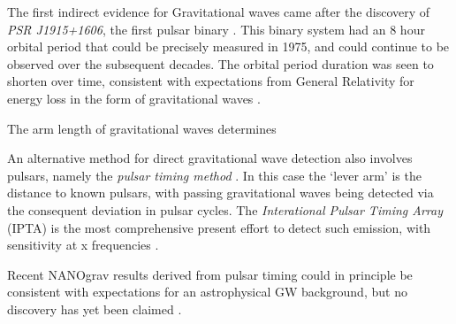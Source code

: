 The first indirect evidence for Gravitational waves came after the discovery of \emph{PSR J1915+1606}, the first pulsar binary . This binary system had an 8 hour orbital period that could be precisely measured in 1975, and could continue to be observed over the subsequent decades. The orbital period duration was seen to shorten over time, consistent with expectations from General Relativity for energy loss in the form of gravitational waves . 

The arm length of gravitational waves determines 

An alternative method for direct gravitational wave detection also involves pulsars, namely the \emph{pulsar timing method} . In this case the `lever arm' is the distance to known pulsars, with passing gravitational waves being detected via the consequent deviation in pulsar cycles. The \emph{Interational Pulsar Timing Array} (IPTA) is the most comprehensive present effort to detect such emission, with sensitivity at x frequencies .

Recent NANOgrav results derived from pulsar timing could in principle be consistent with expectations for an astrophysical GW background, but no discovery has yet been claimed .